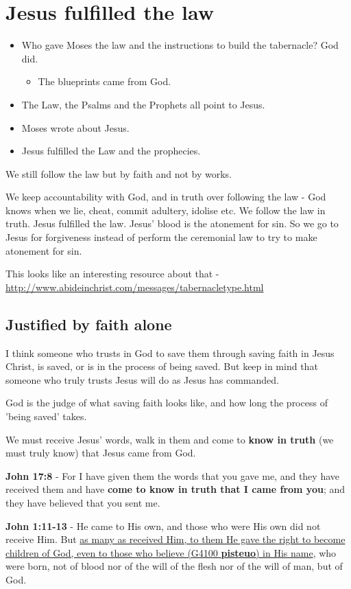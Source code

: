 \documentclass[11pt]{article}
\begin{document}
\section{Jesus fulfilled the law}
\label{sec:orgeb6c8ec}
\begin{itemize}
\item Who gave Moses the law and the instructions to build the tabernacle? God did.
\begin{itemize}
\item The blueprints came from God.
\end{itemize}
\item The Law, the Psalms and the Prophets all point to Jesus.
\item Moses wrote about Jesus.
\item Jesus fulfilled the Law and the prophecies.
\end{itemize}

We still follow the law but by faith and not by works.

We keep accountability with God, and in truth over following the law - God knows when we lie, cheat, commit adultery, idolise etc.
We follow the law in truth.
Jesus fulfilled the law. Jesus' blood is the atonement for sin.
So we go to Jesus for forgiveness instead of perform the ceremonial law to try to make atonement for sin.

This looks like an interesting resource about that - \url{http://www.abideinchrist.com/messages/tabernacletype.html}

\subsection{Justified by faith alone}
\label{sec:org70ce45e}
I think someone who trusts in God to save them through saving faith in Jesus Christ, is saved, or is in the process of being saved.
But keep in mind that someone who truly trusts Jesus will do as Jesus has commanded.

God is the judge of what saving faith looks like, and how long the process of 'being saved' takes.

We must receive Jesus' words, walk in them and come to \textbf{know in truth} (we must truly know) that Jesus came from God.

\textbf{John 17:8} - For I have given them the words that you gave me, and they have received them and have \textbf{come to know in truth that I came from you}; and they have believed that you sent me.

\textbf{John 1:11-13} - He came to His own, and those who were His own did not receive Him. But \uline{as many as received Him, to them He gave the right to become children of God, even to those who believe (G4100 \textbf{pisteuo}) in His name}, who were born, not of blood nor of the will of the flesh nor of the will of man, but of God.
\end{document}
